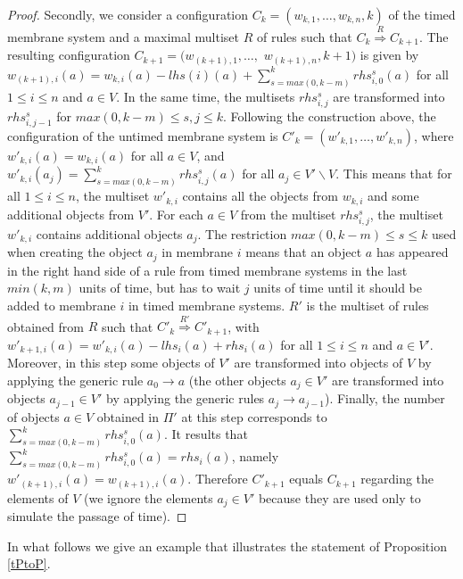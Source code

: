 \documentclass{eptcs}
\begin{document}
\begin{proof}
Secondly, we consider a configuration
$C_k=(w_{k,1},\ldots,w_{k,n},k)$ of the timed membrane system and a
maximal multiset $R$ of rules such that
$C_k\stackrel{R}{\Longrightarrow}C_{k+1}$. The resulting
configuration $C_{k+1}=(w_{(k+1),1},\ldots,$ $w_{(k+1),n},k+1)$ is
given by
$w_{(k+1),i}(a)=w_{k,i}(a)-lhs(i)(a)+\sum^{k}_{s=max(0,k-m)}
rhs^s_{i,0}(a)$ for all $1\leq i\leq n$ and $a \in V$. In the same
time, the multisets $rhs^s_{i,j}$ are transformed into
$rhs^{s}_{i,j-1}$ for $max(0,k-m) \leq s,j \leq k$. Following the
construction above, the configuration of the untimed membrane system
is $C'_k=(w'_{k,1},\ldots,w'_{k,n})$, where $w'_{k,i}(a)=w_{k,i}(a)$
for all $a\in V$, and $w'_{k,i}(a_j)=\sum^{k}_{s=max(0,k-m)}
rhs^{s}_{i,j}(a)$ for all $a_j \in V'\backslash V$. This means that
for all $1 \leq i \leq n$, the multiset $w'_{k,i}$ contains all the
objects from $w_{k,i}$ and some additional objects from $V'$. For
each $a\in V$ from the multiset $rhs^s_{i,j}$, the multiset $w'_{k,i}$
contains additional objects $a_j$. The restriction $max(0,k-m) \leq
s\leq k$ used when creating the object $a_j$ in membrane $i$ means
that an object $a$ has appeared in the right hand side of a rule
from timed membrane systems in the last $min(k,m)$ units of time,
but has to wait $j$ units of time until it should be added to
membrane $i$ in timed membrane systems. $R'$ is the multiset of
rules obtained from $R$ such that
$C'_k\stackrel{R'}{\Longrightarrow}C'_{k+1}$, with
$w'_{k+1,i}(a)=w'_{k,i}(a)-lhs_{i}(a)+rhs_i(a)$ for all $1\leq i\leq
n$ and $a \in V'$. Moreover, in this step some objects of $V'$ are
transformed into objects of $V$ by applying the generic rule $a_0
\rightarrow a$ (the other objects $a_j \in V'$ are transformed into
objects $a_{j-1} \in V'$ by applying the generic rules $a_j
\rightarrow a_{j-1}$). Finally, the number of objects $a\in V$
obtained in $\Pi'$ at this step corresponds to
$\sum^{k}_{s=max(0,k-m)}rhs^s_{i,0}(a)$. It results that
$\sum^{k}_{s=max(0,k-m)} rhs^s_{i,0}(a)=rhs_i(a)$, namely
$w'_{(k+1),i}(a)=w_{(k+1),i}(a)$. Therefore $C'_{k+1}$ equals
$C_{k+1}$ regarding the elements of $V$ (we ignore the
elements $a_j\in V'$ because they are used only to simulate the passage of time).
\end{proof}

In what follows we give an example that illustrates the statement of
Proposition \ref{tPtoP}.
\end{document}
